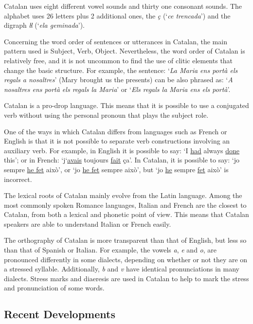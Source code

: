 \begin{multicols}{2}
Catalan uses eight different vowel sounds and thirty one consonant sounds. The alphabet uses 26 letters plus 2 additional ones, the \textit{ç} (‘\textit{ce trencada}’) and the digraph \textit{ŀl} (‘\textit{ela geminada}’).


Concerning the word order of sentences or utterances in Catalan, the main pattern used is Subject, Verb, Object. Nevertheless, the word order of Catalan is relatively free, and it is not uncommon to find the use of clitic elements that change the basic structure. For example, the sentence: ‘\textit{La Maria ens portà els regals a nosaltres}’ (Mary brought us the presents) can be also phrased as: ‘\textit{A nosaltres ens portà els regals la Maria}’ or ‘\textit{Els regals la Maria ens els portà}’.

Catalan is a pro-drop language. This means that it is possible to use a conjugated verb without using the personal pronoun that plays the subject role.

One of the ways in which Catalan differs from languages such as  French or English is that it is not possible to separate verb constructions involving an auxiliary verb. For example, in English it is possible to say: ‘I \underline{had} always \underline{done} this’; or in French: ‘j‘\underline{avais} toujours \underline{fait} ça’. In Catalan, it is possible to say: ‘jo sempre \underline{he fet} això’, or ‘jo \underline{he fet} sempre això’, but ‘jo \underline{he} sempre \underline{fet} això’ is incorrect.

The lexical roots of Catalan mainly evolve from the Latin language. Among the most commonly spoken Romance languages, Italian and French are the closest to Catalan, from both a lexical and phonetic point of view. This means that Catalan speakers are able to understand Italian or French easily.

The orthography of Catalan is more transparent than that of English, but less so than that of Spanish or Italian. For example, the vowels \textit{a}, \textit{e} and \textit{o}, are pronounced differently in some dialects, depending on whether or not they are on a stressed syllable. Additionally, \textit{b} and \textit{v} have identical pronunciations in many dialects. Stress marks and diaeresis are used in Catalan to help to mark the stress and pronunciation of some words.

\subsection{Recent Developments}


\end{multicols}
